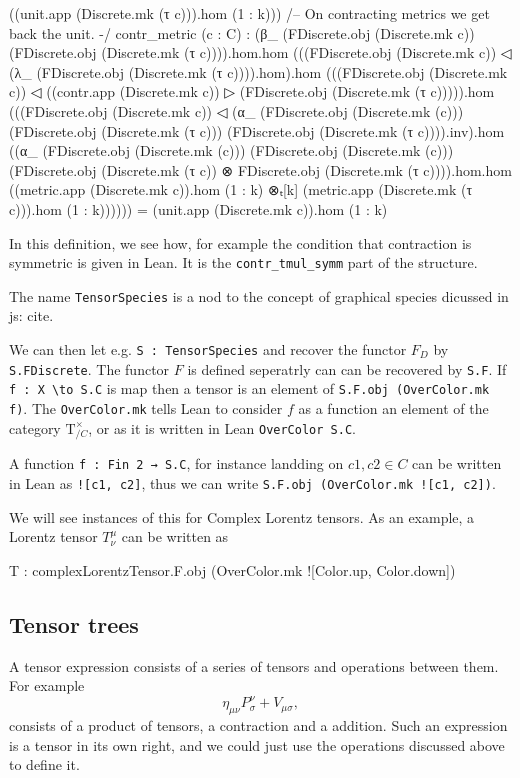 \documentclass[a4paper, 11pt]{article}
\newcommand{\js}[1]{ {\color{magenta} js:  #1}}
\begin{document}
\begin{codeLong}
    ((unit.app (Discrete.mk (τ c))).hom (1 : k)))
  /-- On contracting metrics we get back the unit. -/
  contr_metric (c : C) :
    (β_ (FDiscrete.obj (Discrete.mk c)) (FDiscrete.obj (Discrete.mk (τ c)))).hom.hom
    (((FDiscrete.obj (Discrete.mk c)) ◁ (λ_ (FDiscrete.obj (Discrete.mk (τ c)))).hom).hom
    (((FDiscrete.obj (Discrete.mk c)) ◁ ((contr.app (Discrete.mk c)) ▷
    (FDiscrete.obj (Discrete.mk (τ c))))).hom
    (((FDiscrete.obj (Discrete.mk c)) ◁ (α_ (FDiscrete.obj (Discrete.mk (c)))
      (FDiscrete.obj (Discrete.mk (τ c))) (FDiscrete.obj (Discrete.mk (τ c)))).inv).hom
    ((α_ (FDiscrete.obj (Discrete.mk (c))) (FDiscrete.obj (Discrete.mk (c)))
      (FDiscrete.obj (Discrete.mk (τ c)) ⊗ FDiscrete.obj (Discrete.mk (τ c)))).hom.hom
    ((metric.app (Discrete.mk c)).hom (1 : k) ⊗ₜ[k]
      (metric.app (Discrete.mk (τ c))).hom (1 : k))))))
    = (unit.app (Discrete.mk c)).hom (1 : k)
\end{codeLong}
In this definition, we see how, for example the condition that contraction is symmetric 
is given in Lean. It is the \lstinline|contr_tmul_symm| part of the structure.

The name \lstinline|TensorSpecies| is a nod to the concept of graphical species 
dicussed in \js{cite}. 

We can then let e.g. \lstinline|S : TensorSpecies| and recover the functor $F_D$ 
by \lstinline|S.FDiscrete|. The functor $F$ is defined seperatrly can can be recovered
by \lstinline|S.F|. If \lstinline|f : X \to S.C| is map then a tensor is an element of 
\lstinline|S.F.obj (OverColor.mk f)|. The \lstinline|OverColor.mk| tells Lean to consider $f$ as 
a function an element of the category $\mathrm{T}_{/C}^\times$, or as it is written in Lean 
\lstinline|OverColor S.C|. 

A function \lstinline|f : Fin 2 → S.C|, for instance landding on $c1, c2 \in C$ can be written in 
Lean as \lstinline|![c1, c2]|, thus we can write \lstinline|S.F.obj (OverColor.mk ![c1, c2])|. 

We will see instances of this for Complex Lorentz tensors. As an example, a Lorentz tensor 
$T^\mu_\nu$ can be written as 
\begin{code}
T : complexLorentzTensor.F.obj (OverColor.mk ![Color.up, Color.down])
\end{code}

\subsection{Tensor trees} \label{sec:tensorTrees}
A tensor expression consists of a series of tensors and operations between them. 
For example 
\begin{equation}
  \eta_{\mu \nu}P^\nu_\sigma+ V_{\mu \sigma},
\end{equation}
consists of a product of tensors, a contraction and a addition. 
Such an expression is a tensor in its own right, and we could just use the operations discussed above 
to define it. 
\end{document}
